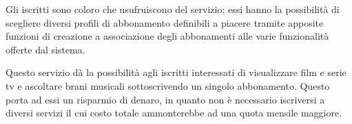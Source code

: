 \begin{flushleft}
    {Gli iscritti sono coloro che usufruiscono del servizio; essi hanno la possibilità di scegliere diversi profili di abbonamento definibili a piacere tramite apposite funzioni di creazione a associazione degli abbonamenti alle varie funzionalità offerte dal sistema.}
\end{flushleft}

\begin{flushleft}
    {Questo servizio dà la possibilità agli iscritti interessati di visualizzare film e serie tv e ascoltare brani musicali sottoscrivendo un singolo abbonamento. Questo porta ad essi un risparmio di denaro, in quanto non è necessario iscriversi a diversi servizi il cui costo totale ammonterebbe ad una quota mensile maggiore.}
\end{flushleft}